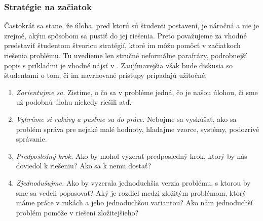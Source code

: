 {%




\subsubsection*{Stratégie na začiatok}

Častokrát sa stane, že úloha, pred ktorú sú študenti postavení, je náročná a nie je zrejmé, akým spôsobom sa pustiť do jej riešenia. Preto považujeme za vhodné predstaviť študentom štvoricu stratégií, ktoré im môžu pomôcť v začiatkoch riešenia problému. Tu uvedieme len stručné neformálne parafrázy, podrobnejší popis s príkladmi je vhodné nájsť v \cite{zeitz2007}. Zaujímavejšia však bude diskusia so študentami o tom, či im navrhované prístupy pripadajú užitočné.
\begin{enumerate}
\item \textit{Zorientujme sa.} Zistime, o čo sa v probléme jedná, čo je našou úlohou, či sme už podobnú úlohu niekedy riešili atď.
\item \textit{Vyhrňme si rukávy a pusťme sa do práce.} Nebojme sa vyskúšať, ako sa problém správa pre nejaké malé hodnoty, hľadajme vzorce, systémy, podozrivé správanie.
\item \textit{Predposledný krok.} Ako by mohol vyzerať predposledný krok, ktorý by nás doviedol k riešeniu? Ako sa k nemu dostať?
\item \textit{Zjednodušujme.} Ako by vyzerala jednoduchšia verzia problému, s ktorou by sme sa vedeli popasovať? Aký je rozdiel medzi zložitým problémom, ktorý máme práce v rukách a jeho jednoduchšou variantou? Ako nám jednoduchší problém pomôže v riešení zložitejšieho?
\end{enumerate}

}
